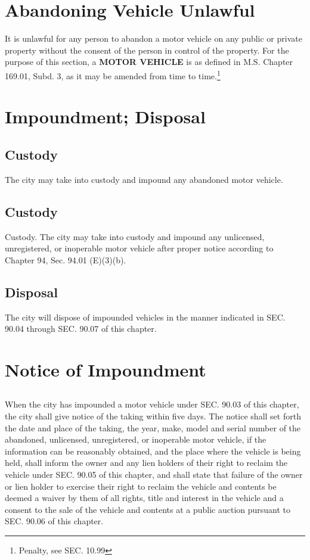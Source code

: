 \section{Abandoning Vehicle Unlawful}
It is unlawful for any person to abandon a motor vehicle on any public or private property without the consent of the person in control of the property.  For the purpose of this section, a \textbf{MOTOR VEHICLE} is as defined in M.S. Chapter 169.01, Subd. 3, as it may be amended from time to time.\footnote{Penalty, see SEC. 10.99}

\section{Impoundment; Disposal}
\subsection{Custody}
The city may take into custody and impound any abandoned motor vehicle.
\subsection{Custody}
Custody.  The city may take into custody and impound any unlicensed, unregistered, or inoperable motor vehicle after proper notice according to Chapter 94, Sec. 94.01 (E)(3)(b).
\subsection{Disposal}
The city will dispose of impounded vehicles in the manner indicated in SEC. 90.04 through SEC. 90.07 of this chapter.

\section{Notice of Impoundment}
\subsection{}
When the city has impounded a motor vehicle under SEC. 90.03 of this chapter, the city shall give notice of the taking within five days.  The notice shall set forth the date and place of the taking, the year, make, model and serial number of the abandoned, unlicensed, unregistered, or inoperable motor vehicle, if the information can be reasonably obtained, and the place where the vehicle is being held, shall inform the owner and any lien holders of their right to reclaim the vehicle under SEC. 90.05 of this chapter, and shall state that failure of the owner or lien holder to exercise their right to reclaim the vehicle and contents be deemed a waiver by them of all rights, title and interest in the vehicle and a consent to the sale of the vehicle and contents at a public auction pursuant to SEC. 90.06 of this chapter.
